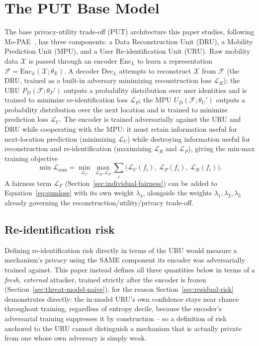 \section{The PUT Base Model}
\label{sec:put-base-model}

The base privacy-utility trade-off (PUT) architecture this paper
studies, following Mo-PAE~\cite{zhan2023mopae}, has three
components: a Data Reconstruction Unit (DRU), a Mobility Prediction
Unit (MPU), and a User Re-identification Unit (URU). Raw mobility data
$\mathcal{X}$ is passed through an encoder $\mathrm{Enc}_L$ to learn a
representation $\mathcal{F} = \mathrm{Enc}_L(\mathcal{X}; \theta_E)$.
A decoder $\mathrm{Dec}_L$ attempts to reconstruct $\mathcal{X}$ from
$\mathcal{F}$ (the DRU, trained as a built-in adversary minimizing
reconstruction loss $\mathcal{L}_R$); the URU
$P_D(\mathcal{F};\theta_P')$ outputs a probability distribution over
user identities and is trained to minimize re-identification loss
$\mathcal{L}_P$; the MPU $U_D(\mathcal{F};\theta_U')$ outputs a
probability distribution over the next location and is trained to
minimize prediction loss $\mathcal{L}_U$. The encoder is trained
adversarially against the URU and DRU while cooperating with the MPU:
it must retain information useful for next-location prediction
(minimizing $\mathcal{L}_U$) while destroying information useful for
reconstruction and re-identification (maximizing $\mathcal{L}_R$ and
$\mathcal{L}_P$), giving the min-max training objective
\begin{equation}
\min\mathcal{L}_{\mathrm{sum}} = \min_{\mathcal{L}_U}\ \max_{\mathcal{L}_R,\mathcal{L}_P}
\sum_{i} \big(\mathcal{L}_U(f_i),\ \mathcal{L}_P(f_i),\ \mathcal{L}_R(f_i)\big).
\label{eq:sumloss}
\end{equation}
A fairness term $\mathcal{L}_F$ (Section~\ref{sec:individual-fairness})
can be added to Equation~\ref{eq:sumloss} with its own weight
$\lambda_4$, alongside the weights $\lambda_1,\lambda_2,\lambda_3$
already governing the reconstruction/utility/privacy trade-off.

\subsection{Re-identification risk}
\label{sec:defs}
Defining re-identification risk directly in terms of the URU would
measure a mechanism's privacy using the SAME component its encoder was
adversarially trained against. This paper instead defines all three
quantities below in terms of a \emph{fresh, external} attacker, trained
strictly after the encoder is frozen (Section~\ref{sec:threat-model-naive}),
for the reason Section~\ref{sec:residual-risk} demonstrates directly:
the in-model URU's own confidence stays near chance throughout
training, regardless of entropy decile, because the encoder's
adversarial training suppresses it by construction -- so a definition
of risk anchored to the URU cannot distinguish a mechanism that is
actually private from one whose own adversary is simply weak.

